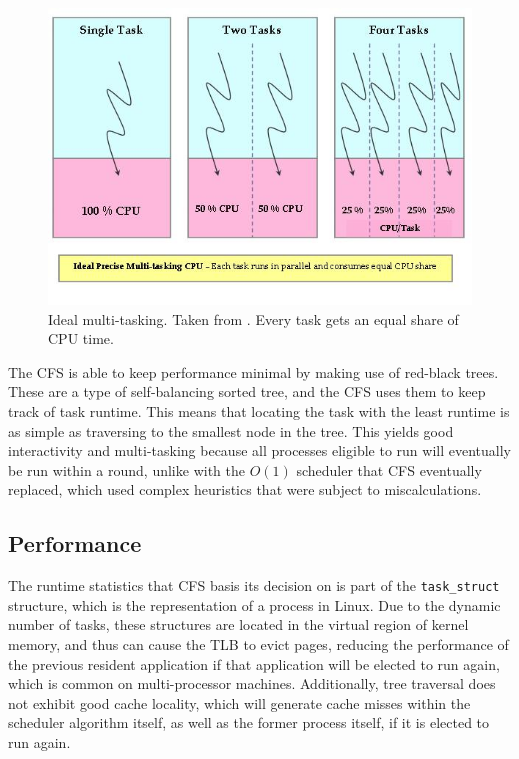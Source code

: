 \documentclass{sig-alternate-10pt}
\begin{document}
\begin{figure}
	\begin{center}
		\includegraphics[width=0.9\linewidth]{fig/mutlitasking.jpg}
		\caption{
			Ideal multi-tasking. Taken from \protect\cite{fig:multitask}. Every task gets an equal share of CPU time.
		}
		\label{fig:cfs_multitask}
	\end{center}
\end{figure}

The CFS is able to keep performance minimal by making use of red-black trees. These are a type of self-balancing sorted tree, and the CFS uses them to keep track of task runtime. This means that locating the task with the least runtime is as simple as traversing to the smallest node in the tree. This yields good interactivity and multi-tasking because all processes eligible to run will eventually be run within a round, unlike with the $O(1)$ scheduler that CFS eventually replaced, which used complex heuristics that were subject to miscalculations.

\subsection{Performance}
The runtime statistics that CFS basis its decision on is part of the \verb|task_struct| structure, which is the representation of a process in Linux. Due to the dynamic number of tasks, these structures are located in the virtual region of kernel memory, and thus can cause the TLB to evict pages, reducing the performance of the previous resident application if that application will be elected to run again, which is common on multi-processor machines. Additionally, tree traversal does not exhibit good cache locality, which will generate cache misses within the scheduler algorithm itself, as well as the former process itself, if it is elected to run again.
\end{document}
